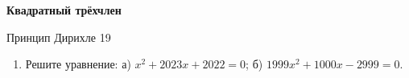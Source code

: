 \documentclass{article}
\begin{document}
\large
	

\begin{center}
\textbf{Квадратный трёхчлен}
\end{center}

Принцип Дирихле 19

\begin{enumerate}[label*=\protect\fbox{\arabic{enumi}}]

\item Решите уравнение: а) $x^2 + 2023x + 2022 = 0$; б) $1999x^2 + 1000x-2999=0$.



\end{enumerate}
\end{document}
